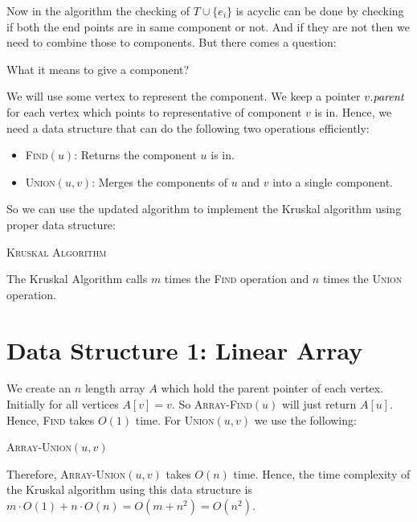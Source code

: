 Now in the algorithm the checking of $T\cup \{e_i\}$ is acyclic can be done by checking if both the end points are in same component or not. And if they are not then we need to combine those to components. But there comes a question:
\begin{question}{}
	What it means to give a component?
\end{question}
We will use some vertex to represent the component. We keep a pointer $v.\emph{parent}$ for each vertex which points to representative of component $v$ is in. Hence, we need a data structure that can do the following two operations efficiently:
\begin{itemize}[label=$\bullet$]
	\item \textsc{Find}$(u)$: Returns the component $u$ is in.
	\item \textsc{Union}$(u,v)$: Merges the components of $u$ and $v$ into a single component.
\end{itemize}
So we can use the updated algorithm to implement the Kruskal algorithm  using proper data structure:
\begin{algorithm}[]
	\caption{\textsc{Kruskal Algorithm}}
	\DontPrintSemicolon
\end{algorithm}
The Kruskal Algorithm calls $m$ times the \textsc{Find} operation and $n$ times the \textsc{Union} operation.
\section{Data Structure 1: Linear Array}
We create an $n$ length array $A$ which hold the parent pointer of each vertex. Initially for all vertices $A[v]=v$. So \textsc{Array-Find}$(u)$ will just return $A[u]$. Hence, \textsc{Find} takes $O(1)$ time. For \textsc{Union}$(u,v)$ we use the following:
\begin{algorithm}[]
	\caption{\textsc{Array-Union}$(u,v)$}
	\DontPrintSemicolon
\end{algorithm}
Therefore, \textsc{Array-Union}$(u,v)$ takes $O(n)$ time. Hence, the time complexity of the Kruskal algorithm using this data structure is $m\cdot O(1)+n\cdot O(n)=O(m+n^2)=O(n^2)$.
